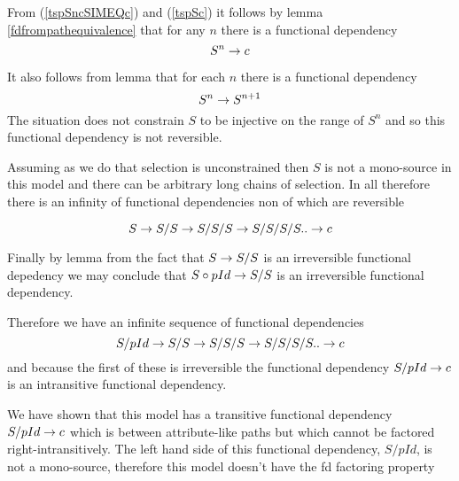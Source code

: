 From (\ref{tspSncSIMEQc}) and (\ref{tspSc}) it follows by lemma \ref{fdfrompathequivalence} that for any $n$ there is a functional dependency
\begin{equation}
\label{tspSnc}
S^n \rightarrow c
\end{equation}


It also follows from lemma  that for each $n$ there is a functional dependency
\begin{equation}
\label{tspSnn1}
S^n \rightarrow S^{n+1}
\end{equation}
The situation does not constrain $S$ to be injective on the range of $S^n$ and so this functional dependency is not reversible.

Assuming as we do that selection is unconstrained then $S$ is not a mono-source in this model and there can be arbitrary long chains of selection.
In  all therefore there is an infinity of functional dependencies non of which are reversible

\begin{equation}
S \rightarrow S/S \rightarrow S/S/S \rightarrow S/S/S/S .. \rightarrow c
\end{equation}

Finally by lemma  from the fact that $S \rightarrow S/S$  is an irreversible functional depedency
we may conclude that $S \circ pId \rightarrow S/S$ is an irreversible functional dependency.

Therefore we have an infinite sequence of functional dependencies
\begin{equation}
S/pId \rightarrow S/S \rightarrow S/S/S \rightarrow S/S/S/S .. \rightarrow c
\end{equation}
and because the first of these is irreversible
the functional dependency
$S/pId \rightarrow c $ 
is an intransitive functional dependency.

We have shown that this model has a transitive functional dependency $S/pId \rightarrow c$ which is between
attribute-like paths but which cannot be factored right-intransitively. The left hand side of this functional dependency, $S/pId$, is not a mono-source, therefore this model doesn't have the fd factoring property 

